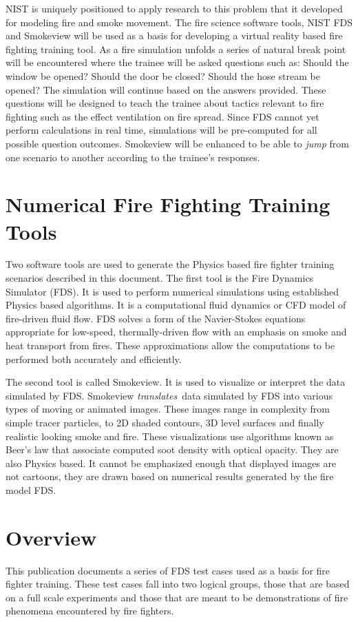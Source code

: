 \documentclass[11pt]{book}
\begin{document}
NIST is uniquely positioned to apply research to this problem that it developed for modeling fire and smoke
movement.  The fire science software tools, NIST FDS and Smokeview will be used as a basis for developing a
virtual reality based fire fighting training tool.  As a fire simulation unfolds a series of natural break point
will be encountered where the trainee will be asked questions such as: Should the window be opened?  Should the
door be closed? Should the hose stream be opened?  The simulation will continue based on the answers provided.
These questions will be designed to teach the trainee about tactics relevant to fire fighting such as the
effect ventilation on fire spread.    Since FDS cannot yet perform calculations in real time, simulations
will be pre-computed for all possible question outcomes.  Smokeview will be enhanced to be able to {\em jump}
from one scenario to another according to the trainee's responses.

\section{Numerical Fire Fighting Training Tools}
Two software tools are used to generate the Physics based fire fighter training scenarios
described in this document.  The first tool is the Fire Dynamics Simulator (FDS).
It is used to perform numerical simulations using established Physics based algorithms.
It is a computational
fluid dynamics or CFD model of fire-driven fluid flow. FDS solves a form of the
Navier-Stokes equations appropriate for low-speed, thermally-driven flow
with an emphasis on smoke and heat transport from fires.
These approximations allow the computations to be performed both accurately and efficiently.

The second tool is called Smokeview.  It is used to visualize or interpret the data
simulated by FDS.  Smokeview {\em translates}\ data simulated by FDS into
various types of moving or animated images.  These images range in complexity from simple tracer particles,
to 2D shaded contours, 3D level surfaces and finally realistic looking smoke and fire.  These visualizations use
algorithms known as Beer's law that associate computed soot density with optical opacity.  They are also Physics based.  It cannot be emphasized enough
that displayed images are not cartoons, they are drawn based on numerical results generated by the fire model FDS.

\section{Overview}
This publication documents a series of FDS test cases used as a basis for fire fighter training.
These test cases fall into two logical groups, those that are based on a full scale experiments and those that are meant to be demonstrations of fire phenomena encountered by fire fighters.
\end{document}
